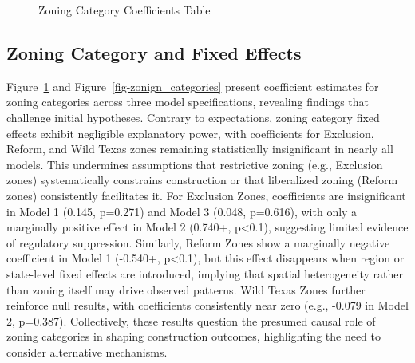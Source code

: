 \documentclass[
  8pt,
  12pt]{article}
\begin{document}
\begin{figure}


\caption{\label{fig-zoning_table}Zoning Category Coefficients Table}

\end{figure}%

\subsection{Zoning Category and Fixed
Effects}\label{zoning-category-and-fixed-effects}

Figure~\ref{fig-zoning_table} and Figure~\ref{fig-zonign_categories}
present coefficient estimates for zoning categories across three model
specifications, revealing findings that challenge initial hypotheses.
Contrary to expectations, zoning category fixed effects exhibit
negligible explanatory power, with coefficients for Exclusion, Reform,
and Wild Texas zones remaining statistically insignificant in nearly all
models. This undermines assumptions that restrictive zoning (e.g.,
Exclusion zones) systematically constrains construction or that
liberalized zoning (Reform zones) consistently facilitates it. For
Exclusion Zones, coefficients are insignificant in Model 1 (0.145,
p=0.271) and Model 3 (0.048, p=0.616), with only a marginally positive
effect in Model 2 (0.740+, p\textless0.1), suggesting limited evidence
of regulatory suppression. Similarly, Reform Zones show a marginally
negative coefficient in Model 1 (-0.540+, p\textless0.1), but this
effect disappears when region or state-level fixed effects are
introduced, implying that spatial heterogeneity rather than zoning
itself may drive observed patterns. Wild Texas Zones further reinforce
null results, with coefficients consistently near zero (e.g., -0.079 in
Model 2, p=0.387). Collectively, these results question the presumed
causal role of zoning categories in shaping construction outcomes,
highlighting the need to consider alternative mechanisms.
\end{document}
